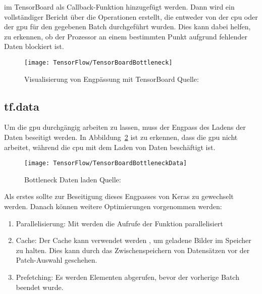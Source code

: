 \medskip

im TensorBoard als Callback-Funktion hinzugefügt werden. Dann wird ein vollständiger Bericht über die Operationen erstellt, die entweder von der \ac{cpu} oder der \ac{gpu} für den gegebenen Batch durchgeführt wurden. Dies kann dabei helfen, zu erkennen, ob der Prozessor an einem bestimmten Punkt aufgrund fehlender Daten blockiert ist.

\begin{figure}[H]
    \begin{center}
        \texttt{[image: TensorFlow/TensorBoardBottleneck]}
        \caption{Visualisierung von Engpässung mit TensorBoard Quelle:\cite{KDnuggets.11.12.2020}} 
        \label{TensorBoardBottleneck}
    \end{center}
\end{figure}

\subsection{tf.data}


Um die \ac{gpu} durchgängig arbeiten zu lassen, muss der Engpass des Ladens der Daten  beseitigt werden. In Abbildung~\ref{TensorBoardBottleneckData} ist zu erkennen, dass die \ac{gpu} nicht arbeitet, während die \ac{cpu} mit dem Laden von Daten beschäftigt ist.

\begin{figure}[H]
    \begin{center}
        \texttt{[image: TensorFlow/TensorBoardBottleneckData]}
        \caption{Bottleneck Daten laden Quelle:\cite{KDnuggets.11.12.2020}} 
        \label{TensorBoardBottleneckData}
    \end{center}
\end{figure}

Als erstes sollte zur Beseitigung dieses Engpasses von Keras  zu  gewechselt werden. Danach können weitere Optimierungen vorgenommen werden:

\begin{enumerate}
    \item Parallelisierung: Mit  werden die Aufrufe der Funktion    parallelisiert
    \item Cache: Der Cache kann verwendet werden , um geladene Bilder im Speicher zu halten. Dies kann durch das Zwischenspeichern von Datensätzen vor der Patch-Auswahl geschehen.
    \item Prefetching: Es werden Elementen abgerufen, bevor der vorherige Batch beendet wurde.
\end{enumerate}

